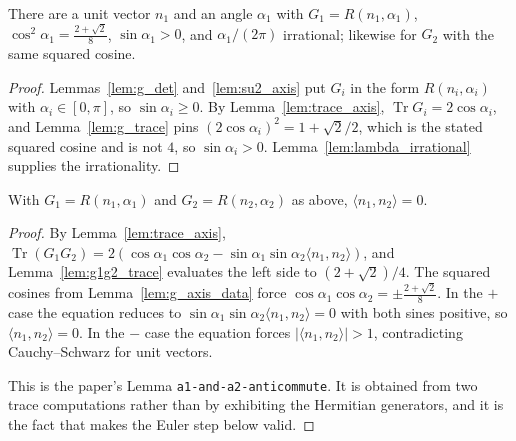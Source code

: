 \begin{lemma}
  \label{lem:g_axis_data}
  \leanok
  There are a unit vector $n_1$ and an angle $\alpha_1$ with
  $G_1 = R(n_1,\alpha_1)$, $\cos^2\alpha_1 = \tfrac{2+\sqrt2}{8}$,
  $\sin\alpha_1 > 0$, and $\alpha_1/(2\pi)$ irrational; likewise for $G_2$ with
  the same squared cosine.
\end{lemma}

\begin{proof}
  \leanok
  Lemmas~\ref{lem:g_det} and~\ref{lem:su2_axis} put $G_i$ in the form
  $R(n_i,\alpha_i)$ with $\alpha_i \in [0,\pi]$, so $\sin\alpha_i \ge 0$.  By
  Lemma~\ref{lem:trace_axis}, $\operatorname{Tr} G_i = 2\cos\alpha_i$, and
  Lemma~\ref{lem:g_trace} pins $(2\cos\alpha_i)^2 = 1 + \sqrt2/2$, which is the
  stated squared cosine and is not $4$, so $\sin\alpha_i > 0$.
  Lemma~\ref{lem:lambda_irrational} supplies the irrationality.
\end{proof}

\begin{lemma}
  \label{lem:g_axes}
  \leanok
  With $G_1 = R(n_1,\alpha_1)$ and $G_2 = R(n_2,\alpha_2)$ as above,
  $\langle n_1, n_2\rangle = 0$.
\end{lemma}

\begin{proof}
  \leanok
  By Lemma~\ref{lem:trace_axis},
  $\operatorname{Tr}(G_1G_2)
   = 2(\cos\alpha_1\cos\alpha_2
       - \sin\alpha_1\sin\alpha_2\langle n_1,n_2\rangle)$, and
  Lemma~\ref{lem:g1g2_trace} evaluates the left side to $(2+\sqrt2)/4$.  The
  squared cosines from Lemma~\ref{lem:g_axis_data} force
  $\cos\alpha_1\cos\alpha_2 = \pm\tfrac{2+\sqrt2}{8}$.  In the $+$ case the
  equation reduces to $\sin\alpha_1\sin\alpha_2\langle n_1,n_2\rangle = 0$ with
  both sines positive, so $\langle n_1,n_2\rangle = 0$.  In the $-$ case the
  equation forces $\lvert\langle n_1,n_2\rangle\rvert > 1$, contradicting
  Cauchy--Schwarz for unit vectors.

  This is the paper's Lemma \texttt{a1-and-a2-anticommute}.  It is obtained
  from two trace computations rather than by exhibiting the Hermitian
  generators, and it is the fact that makes the Euler step below valid.
\end{proof}

